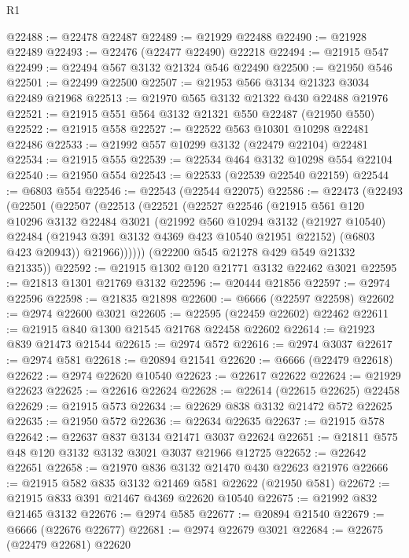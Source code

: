 \begin{lexlean}{R1}
\begin{coremodule}
@22488 := @22478 @22487
@22489 := @21929 @22488
@22490 := @21928 @22489
@22493 := @22476 (@22477 @22490) @22218
@22494 := @21915 @547
@22499 := @22494 @567 @3132 @21324 @546 @22490
@22500 := @21950 @546
@22501 := @22499 @22500
@22507 := @21953 @566 @3134 @21323 @3034 @22489 @21968
@22513 := @21970 @565 @3132 @21322 @430 @22488 @21976
@22521 := @21915 @551 @564 @3132 @21321 @550 @22487 (@21950 @550)
@22522 := @21915 @558
@22527 := @22522 @563 @10301 @10298 @22481 @22486
@22533 := @21992 @557 @10299 @3132 (@22479 @22104) @22481
@22534 := @21915 @555
@22539 := @22534 @464 @3132 @10298 @554 @22104
@22540 := @21950 @554
@22543 := @22533 (@22539 @22540 @22159)
@22544 := @6803 @554
@22546 := @22543 (@22544 @22075)
@22586 := @22473
    (@22493
      (@22501
        (@22507
          (@22513
            (@22521
              (@22527
                @22546
                (@21915
                  @561
                  @120
                  @10296
                  @3132
                  @22484
                  @3021
                  (@21992
                    @560
                    @10294
                    @3132
                    (@21927 @10540)
                    @22484
                    (@21943 @391 @3132 @4369 @423 @10540 @21951 @22152)
                    (@6803 @423 @20943))
                  @21966))))))
      (@22200 @545 @21278 @429 @549 @21332 @21335))
@22592 := @21915 @1302 @120 @21771 @3132 @22462 @3021
@22595 := @21813 @1301 @21769 @3132
@22596 := @20444 @21856
@22597 := @2974 @22596
@22598 := @21835 @21898
@22600 := @6666 (@22597 @22598)
@22602 := @2974 @22600 @3021
@22605 := @22595 (@22459 @22602) @22462
@22611 := @21915 @840 @1300 @21545 @21768 @22458 @22602
@22614 := @21923 @839 @21473 @21544
@22615 := @2974 @572
@22616 := @2974 @3037
@22617 := @2974 @581
@22618 := @20894 @21541
@22620 := @6666 (@22479 @22618)
@22622 := @2974 @22620 @10540
@22623 := @22617 @22622
@22624 := @21929 @22623
@22625 := @22616 @22624
@22628 := @22614 (@22615 @22625) @22458
@22629 := @21915 @573
@22634 := @22629 @838 @3132 @21472 @572 @22625
@22635 := @21950 @572
@22636 := @22634 @22635
@22637 := @21915 @578
@22642 := @22637 @837 @3134 @21471 @3037 @22624
@22651 := @21811 @575 @48 @120 @3132 @3132 @3021 @3037 @21966 @12725
@22652 := @22642 @22651
@22658 := @21970 @836 @3132 @21470 @430 @22623 @21976
@22666 := @21915 @582 @835 @3132 @21469 @581 @22622 (@21950 @581)
@22672 := @21915 @833 @391 @21467 @4369 @22620 @10540
@22675 := @21992 @832 @21465 @3132
@22676 := @2974 @585
@22677 := @20894 @21540
@22679 := @6666 (@22676 @22677)
@22681 := @2974 @22679 @3021
@22684 := @22675 (@22479 @22681) @22620

\end{coremodule}
\end{lexlean}
